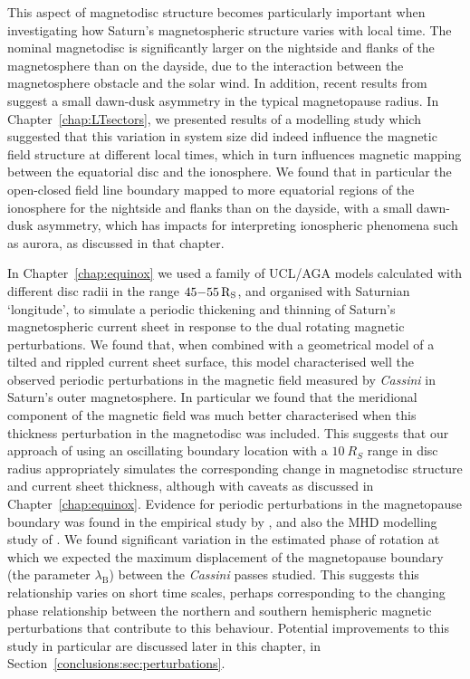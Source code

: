 This aspect of magnetodisc structure becomes particularly important when investigating how Saturn's magnetospheric structure varies with local time. The nominal magnetodisc is significantly larger on the nightside and flanks of the magnetosphere than on the dayside, due to the interaction between the magnetosphere obstacle and the solar wind. In addition, recent results from \citet{pilkington2015b} suggest a small dawn-dusk asymmetry in the typical magnetopause radius. In Chapter~\ref{chap:LTsectors}, we presented results of a modelling study which suggested that this variation in system size did indeed influence the magnetic field structure at different local times, which in turn influences magnetic mapping between the equatorial disc and the ionosphere. We found that in particular the open-closed field line boundary mapped to more equatorial regions of the ionosphere for the nightside and flanks than on the dayside, with a small dawn-dusk asymmetry, which has impacts for interpreting ionospheric phenomena such as aurora, as discussed in that chapter.

In Chapter~\ref{chap:equinox} we used a family of UCL/AGA models calculated with different disc radii in the range $45{\--}\SI{55}{R_S}$, and organised with Saturnian `longitude', to simulate a periodic thickening and thinning of Saturn's magnetospheric current sheet in response to the dual rotating magnetic perturbations. We found that, when combined with a geometrical model of a tilted and rippled current sheet surface, this model characterised well the observed periodic perturbations in the magnetic field measured by \textit{Cassini} in Saturn's outer magnetosphere. In particular we found that the meridional component of the magnetic field was much better characterised when this thickness perturbation in the magnetodisc was included. This suggests that our approach of using an oscillating boundary location with a $\SI{10}{R_S}$ range in disc radius appropriately simulates the corresponding change in magnetodisc structure and current sheet thickness, although with caveats as discussed in Chapter~\ref{chap:equinox}. Evidence for periodic perturbations in the magnetopause boundary was found in the empirical study by \citet{clarke2010}, and also the MHD modelling study of \citet{kivelson2014}. We found significant variation in the estimated phase of rotation at which we expected the maximum displacement of the magnetopause boundary (the parameter $\lambda_\mathrm{B}$) between the \textit{Cassini} passes studied. This suggests this relationship varies on short time scales, perhaps corresponding to the changing phase relationship between the northern and southern hemispheric magnetic perturbations that contribute to this behaviour. Potential improvements to this study in particular are discussed later in this chapter, in Section~\ref{conclusions:sec:perturbations}.

